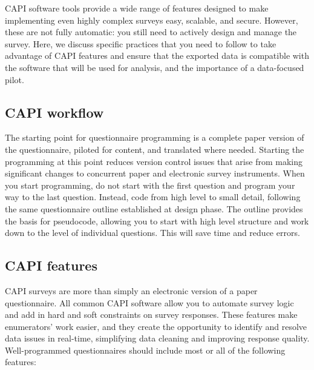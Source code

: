 CAPI software tools provide a wide range of features designed to make implementing even highly complex surveys easy, scalable, and secure.
However, these are not fully automatic: you still need to actively design and manage the survey.
Here, we discuss specific practices that you need to follow to take advantage of CAPI features and ensure that the exported data is compatible with the software that will be used for analysis, and the importance of a data-focused pilot.

\subsection{CAPI workflow}
The starting point for questionnaire programming is a complete paper version of the questionnaire, piloted for content, and translated where needed.
Starting the programming at this point reduces version control issues that arise from making significant changes to concurrent paper and electronic survey instruments.
When you start programming, do not start with the first question and program your way to the last question.
Instead, code from high level to small detail, following the same questionnaire outline established at design phase.
The outline provides the basis for pseudocode, allowing you to start with high level structure and work down to the level of individual questions. This will save time and reduce errors.

\subsection{CAPI features}
CAPI surveys are more than simply an electronic version of a paper questionnaire.
All common CAPI software allow you to automate survey logic and add in hard and soft constraints on survey responses.
These features make enumerators' work easier, and they create the opportunity to identify and resolve data issues in real-time, simplifying data cleaning and improving response quality.
Well-programmed questionnaires should include most or all of the following features:

